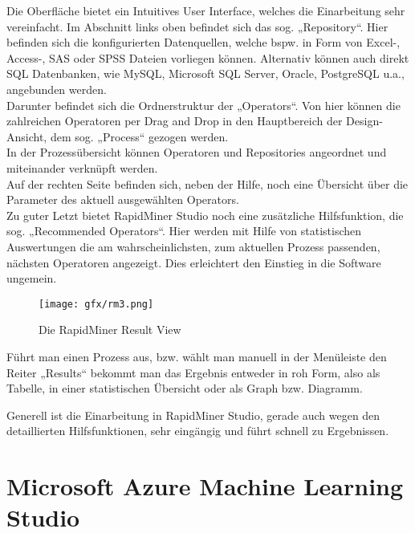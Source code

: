 Die Oberfläche bietet ein Intuitives User Interface, welches die Einarbeitung
sehr vereinfacht. Im Abschnitt links oben befindet sich das sog. „Repository“.
Hier befinden sich die konfigurierten Datenquellen, welche bspw. in Form von
Excel-, Access-, SAS oder SPSS Dateien vorliegen können. Alternativ können auch
direkt SQL Datenbanken, wie MySQL, Microsoft SQL Server, Oracle, PostgreSQL
u.a., angebunden werden. \\
Darunter befindet sich die Ordnerstruktur der „Operators“. Von hier können die
zahlreichen Operatoren per Drag and Drop in den Hauptbereich der Design-Ansicht,
dem sog. „Process“ gezogen werden. \\
In der Prozessübersicht können Operatoren und Repositories angeordnet und
miteinander verknüpft werden. \\
Auf der rechten Seite befinden sich, neben der Hilfe, noch eine Übersicht über
die Parameter des aktuell ausgewählten Operators. \\
Zu guter Letzt bietet RapidMiner Studio noch eine zusätzliche Hilfsfunktion,
die sog. „Recommended Operators“. Hier werden mit Hilfe von statistischen
Auswertungen die am wahrscheinlichsten, zum aktuellen Prozess passenden,
nächsten Operatoren angezeigt. Dies erleichtert den Einstieg in die Software ungemein.

\begin{figure}[htb]
  \texttt{[image: gfx/rm3.png]}
	\caption{Die RapidMiner Result View}
	\label{fig:software:rm:res}
\end{figure}

Führt man einen Prozess aus, bzw. wählt man manuell in der Menüleiste den Reiter
„Results“ bekommt man das Ergebnis entweder in roh Form, also als Tabelle, in
einer statistischen Übersicht oder als Graph bzw. Diagramm.


Generell ist die Einarbeitung in RapidMiner Studio, gerade auch wegen den
detaillierten Hilfsfunktionen, sehr eingängig und führt schnell zu Ergebnissen.

\pagebreak

\section{Microsoft Azure Machine Learning Studio}
\label{sec:software:msa}

